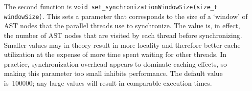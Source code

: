     The second function is {\tt void set\_synchronizationWindowSize(size\_t
windowSize)}. This sets a parameter that corresponds to the size of a `window'
of AST nodes that the parallel threads use to synchronize. The value is, in
effect, the number of AST nodes that are visited by each thread before
synchronizing. Smaller values may in theory result in more locality and
therefore better cache utilization at the expense of more time spent waiting
for other threads. In practice, synchronization overhead appears to dominate
caching effects, so making this parameter too small inhibits performance. The
default value is~100000; any large values will result in comparable execution
times.
